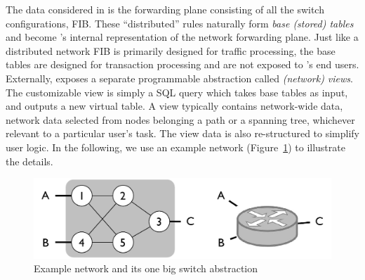 \label{sec:details}


The data considered in \Sys is the forwarding plane consisting of all
the switch configurations, \ie FIB.  These ``distributed'' rules
naturally form \Sys \textit{base (stored) tables} and become \Sys's
internal representation of the network forwarding plane. Just like a
distributed network FIB is primarily designed for traffic processing,
the base tables are designed for transaction processing and are not exposed
to \Sys's end users. Externally, \Sys exposes a separate programmable
abstraction called \textit{(network)
  views}.  %
The customizable view is simply a SQL query which takes base tables as
input, and outputs a new virtual table. A view typically
contains network-wide data, \eg network data selected from nodes
belonging a path or a spanning tree, whichever relevant to a
particular user's task. The view data is also re-structured to simplify
user logic. In the following, we use an example network
(Figure~\ref{fig:eg-one-big-switch}) to illustrate the details.

\vspace{-.5em}
\begin{figure}[ht!]
  \centering
  \includegraphics[width=.95\linewidth]{eg-one-big-switch.pdf}
  \caption{\footnotesize Example network and its one big switch
    abstraction}
  \label{fig:eg-one-big-switch}
\end{figure}
\vspace{-1em}

